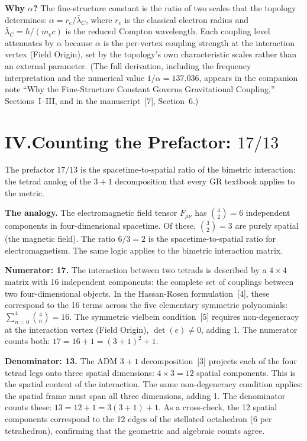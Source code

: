 \documentclass[11pt]{article}
\begin{document}
\textbf{Why $\alpha$?}\quad
The fine-structure constant is the ratio of two scales that the topology determines: $\alpha = r_e / \bar{\lambda}_C$, where $r_e$ is the classical electron radius and $\bar{\lambda}_C = \hbar/(m_e c)$ is the reduced Compton wavelength.
Each coupling level attenuates by $\alpha$ because $\alpha$ is the per-vertex coupling strength at the interaction vertex (Field Origin), set by the topology's own characteristic scales rather than an external parameter.
(The full derivation, including the frequency interpretation and the numerical value $1/\alpha = 137.036$, appears in the companion note ``Why the Fine-Structure Constant Governs Gravitational Coupling,'' Sections~I--III, and in the manuscript~[7], Section~6.)

\section*{IV.\quad Counting the Prefactor: $17/13$}

The prefactor $17/13$ is the spacetime-to-spatial ratio of the bimetric interaction: the tetrad analog of the $3+1$ decomposition that every GR textbook applies to the metric.

\textbf{The analogy.}\quad
The electromagnetic field tensor $F_{\mu\nu}$ has $\binom{4}{2} = 6$ independent components in four-dimensional spacetime.
Of these, $\binom{3}{2} = 3$ are purely spatial (the magnetic field).
The ratio $6/3 = 2$ is the spacetime-to-spatial ratio for electromagnetism.
The same logic applies to the bimetric interaction matrix.

\textbf{Numerator: 17.}\quad
The interaction between two tetrads is described by a $4 \times 4$ matrix with 16 independent components: the complete set of couplings between two four-dimensional objects.
In the Hassan-Rosen formulation~[4], these correspond to the 16 terms across the five elementary symmetric polynomials: $\sum_{n=0}^{4}\binom{4}{n} = 16$.
The symmetric vielbein condition~[5] requires non-degeneracy at the interaction vertex (Field Origin), $\det(e) \neq 0$, adding 1.
The numerator counts both: $17 = 16 + 1 = (3+1)^2 + 1$.

\textbf{Denominator: 13.}\quad
The ADM $3+1$ decomposition~[3] projects each of the four tetrad legs onto three spatial dimensions: $4 \times 3 = 12$ spatial components.
This is the spatial content of the interaction.
The same non-degeneracy condition applies: the spatial frame must span all three dimensions, adding 1.
The denominator counts these: $13 = 12 + 1 = 3(3+1) + 1$.
As a cross-check, the 12 spatial components correspond to the 12 edges of the stellated octahedron (6 per tetrahedron), confirming that the geometric and algebraic counts agree.
\end{document}
